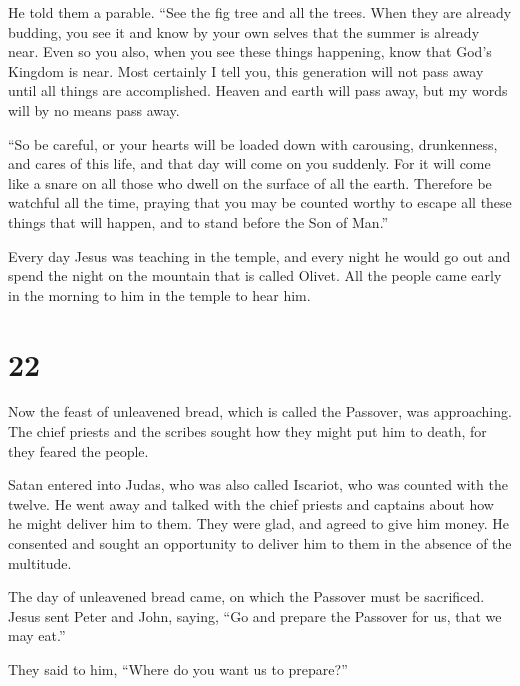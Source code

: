  He told them a parable. ``See the fig tree and all the
trees.  When they are already budding, you see it and
know by your own selves that the summer is already near. 
Even so you also, when you see these things happening, know that God's
Kingdom is near.  Most certainly I tell you, this
generation will not pass away until all things are accomplished.
 Heaven and earth will pass away, but my words will by no
means pass away.

 ``So be careful, or your hearts will be loaded down with
carousing, drunkenness, and cares of this life, and that day will come
on you suddenly.  For it will come like a snare on all
those who dwell on the surface of all the earth. 
Therefore be watchful all the time, praying that you may be counted
worthy to escape all these things that will happen, and to stand before
the Son of Man.''

 Every day Jesus was teaching in the temple, and every
night he would go out and spend the night on the mountain that is called
Olivet.  All the people came early in the morning to him
in the temple to hear him.

\hypertarget{section-12}{%
\section{22}\label{section-12}}

 Now the feast of unleavened bread, which is called the
Passover, was approaching.  The chief priests and the
scribes sought how they might put him to death, for they feared the
people.

 Satan entered into Judas, who was also called Iscariot,
who was counted with the twelve.  He went away and talked
with the chief priests and captains about how he might deliver him to
them.  They were glad, and agreed to give him money.
 He consented and sought an opportunity to deliver him to
them in the absence of the multitude.

 The day of unleavened bread came, on which the Passover
must be sacrificed.  Jesus sent Peter and John, saying,
``Go and prepare the Passover for us, that we may eat.''

 They said to him, ``Where do you want us to prepare?''

